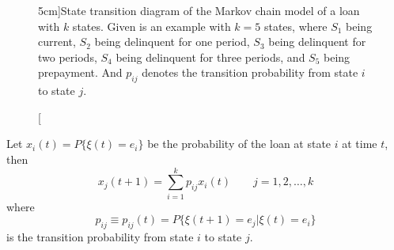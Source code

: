 \begin{figure}
\caption[][5cm]{State transition diagram of the Markov chain model of a loan 
  with $k$ states. Given is an example with $k=5$ states, where $S_1$ being 
  current, $S_2$ being delinquent for one period, $S_3$ being delinquent for two 
  periods, $S_4$ being delinquent for three periods, and $S_5$ being prepayment. 
  And $p_{ij}$ denotes the transition probability from state $i$ to state $j$.}
\end{figure}

Let $x_i(t)=P\{\xi(t)=e_i\}$ be the probability of the loan at state $i$ at time
$t$, then
\begin{equation}
  x_j(t+1) = \sum_{i=1}^k p_{ij} x_i(t) \qquad j=1,2,\dots,k
\end{equation}
where
\begin{equation}
  p_{ij} \equiv p_{ij}(t)=P\{\xi(t+1)=e_j | \xi(t)=e_i \}
\end{equation}
is the transition probability from state $i$ to state $j$.


